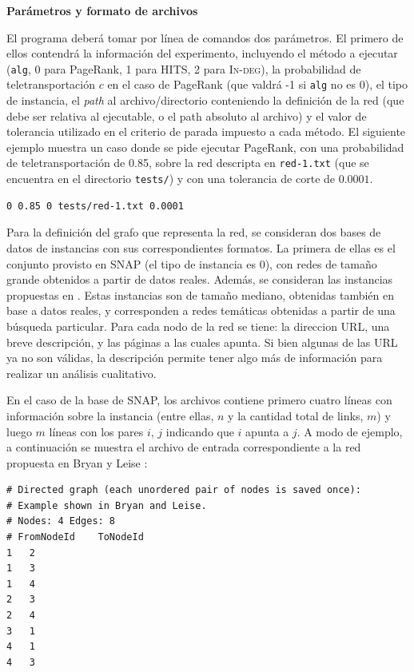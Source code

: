 \documentclass[11pt, a4paper]{article}
\begin{document}
\vskip 5pt
\noindent\textbf{Par\'ametros y formato de archivos}
\vskip 5pt

El programa deber\'a tomar por l\'inea de comandos dos par\'ametros. El primero de ellos contendr\'a la informaci\'on del experimento, incluyendo
el m\'etodo a ejecutar (\verb+alg+, 0 para PageRank, 1 para HITS, 2 para \textsc{In-deg}), la probabilidad de teletransportaci\'on $c$ en el caso
de PageRank (que valdr\'a -1 si \verb+alg+ no es 0), el tipo de instancia, el \emph{path} al archivo/directorio conteniendo la definici\'on de la red (que debe ser relativa
al ejecutable, o el path absoluto al archivo) y el valor de 
tolerancia utilizado en el criterio de parada impuesto a cada m\'etodo. El siguiente ejemplo muestra un caso donde se pide ejecutar PageRank, con una
probabilidad de teletransportaci\'on de 0.85, sobre la red descripta en \verb+red-1.txt+ (que se encuentra en el directorio \verb+tests/+) y con una 
tolerancia de corte de $0.0001$.
\begin{verbatim}
0 0.85 0 tests/red-1.txt 0.0001
\end{verbatim}

Para la definici\'on del grafo que representa la red, se consideran dos bases de datos de instancias con sus correspondientes formatos. La primera
de ellas es el conjunto provisto en SNAP \cite{SNAP} (el tipo de instancia es 0), con redes de tama\~no grande obtenidos a partir de datos reales. Adem\'as, se consideran las 
instancias propuestas en \cite{dataset}. Estas instancias son de tama\~no mediano, obtenidas tambi\'en en base a datos reales, y corresponden a redes
tem\'aticas obtenidas a partir de una b\'usqueda particular. Para cada nodo de la red se tiene: la direccion URL, una breve descripci\'on, y las 
p\'aginas a las cuales apunta. Si bien algunas de las URL ya no son v\'alidas, la descripci\'on permite tener algo m\'as de informaci\'on para 
realizar un an\'alisis cualitativo.

En el caso de la base de SNAP, los archivos contiene primero cuatro l\'ineas con informaci\'on sobre la instancia (entre ellas, $n$ y la cantidad
total de links, $m$) y luego $m$ l\'ineas con los pares $i$, $j$ indicando que $i$ apunta a $j$. A modo de ejemplo, a continuaci\'on se muestra el 
archivo de entrada correspondiente a la red propuesta en Bryan y Leise \cite[Figura 1]{Bryan2006}: 

\begin{verbatim}
# Directed graph (each unordered pair of nodes is saved once): 
# Example shown in Bryan and Leise.
# Nodes: 4 Edges: 8 
# FromNodeId    ToNodeId
1   2
1   3
1   4
2   3
2   4
3   1
4   1
4   3
\end{verbatim}
\end{document}
